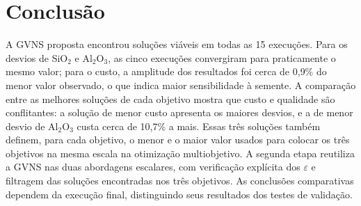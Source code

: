 \documentclass[conference]{IEEEtran}
\begin{document}
\section{Conclusão}\label{sec:conclusao}

A GVNS proposta encontrou soluções viáveis em todas as 15 execuções. Para os desvios de SiO$_2$ e Al$_2$O$_3$, as cinco execuções convergiram para praticamente o mesmo valor; para o custo, a amplitude dos resultados foi cerca de 0{,}9\% do menor valor observado, o que indica maior sensibilidade à semente. A comparação entre as melhores soluções de cada objetivo mostra que custo e qualidade são conflitantes: a solução de menor custo apresenta os maiores desvios, e a de menor desvio de Al$_2$O$_3$ custa cerca de 10{,}7\% a mais. Essas três soluções também definem, para cada objetivo, o menor e o maior valor usados para colocar os três objetivos na mesma escala na otimização multiobjetivo. A segunda etapa reutiliza a GVNS nas duas abordagens escalares, com verificação explícita dos $\varepsilon$ e filtragem das soluções encontradas nos três objetivos. As conclusões comparativas dependem da execução final, distinguindo seus resultados dos testes de validação.
\end{document}
